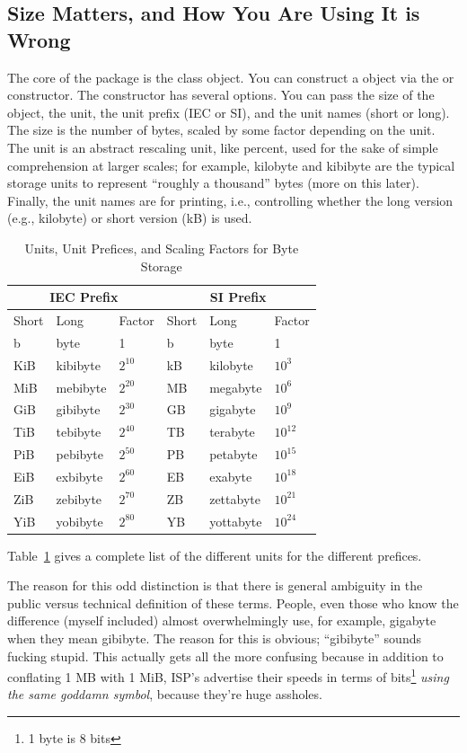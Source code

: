 \subsection{Size Matters, and How You Are Using It is Wrong}
The core of the  package is the  class object.  You can construct a  object via the  or  constructor.  The constructor has several options.  You can pass the size of the object, the unit, the unit prefix (IEC or SI), and the unit names (short or long).  The size is the number of bytes, scaled by some factor depending on the unit.  The unit is an abstract rescaling unit, like percent, used for the sake of simple comprehension at larger scales; for example, kilobyte and kibibyte are the typical storage units to represent ``roughly a thousand'' bytes (more on this later).  Finally, the unit names are for printing, i.e., controlling whether the long version (e.g., kilobyte) or short version (kB) is used.
\begin{table}[ht]
  \centering
  \begin{tabular}{|lll|lll|}\hline
    \multicolumn{3}{|c}{IEC Prefix} & \multicolumn{3}{|c|}{SI Prefix} \\\hline
    Short & Long & Factor & Short & Long & Factor\\\hline
    b & byte & 1 & b & byte & 1\\
    KiB & kibibyte & $2^{10}$ & kB & kilobyte & $10^3$\\
    MiB & mebibyte & $2^{20}$ & MB & megabyte & $10^6$\\
    GiB & gibibyte & $2^{30}$ & GB & gigabyte & $10^9$\\
    TiB & tebibyte & $2^{40}$ & TB & terabyte & $10^{12}$\\
    PiB & pebibyte & $2^{50}$ & PB & petabyte & $10^{15}$\\
    EiB & exbibyte & $2^{60}$ & EB & exabyte & $10^{18}$\\
    ZiB & zebibyte & $2^{70}$ & ZB & zettabyte & $10^{21}$\\
    YiB & yobibyte & $2^{80}$ & YB & yottabyte & $10^{24}$\\\hline
  \end{tabular}
  \caption{Units, Unit Prefices, and Scaling Factors for Byte Storage}
  \label{tab:units}
\end{table}
Table~\ref{tab:units} gives a complete list of the different units for the different prefices.

The reason for this odd distinction is that there is general ambiguity in the public versus technical definition of these terms.  People, even those who know the difference (myself included) almost overwhelmingly use, for example, gigabyte when they mean gibibyte.  The reason for this is obvious; ``gibibyte'' sounds fucking stupid.  This actually gets all the more confusing because in addition to conflating 1 MB with 1 MiB, ISP's advertise their speeds in terms of bits\footnote{1 byte is 8 bits} \emph{using the same goddamn symbol}, because they're huge assholes.

